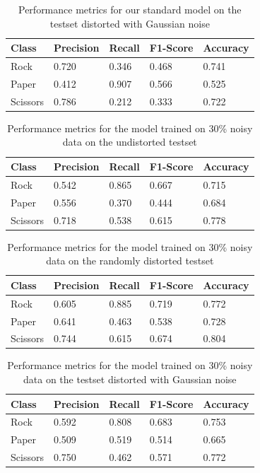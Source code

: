 \documentclass[a4paper]{article}
\begin{document}
\begin{table}[H]
	\centering
	\caption{Performance metrics for our standard model on the testset distorted with Gaussian noise}
	\label{tbl:metrics_model_gauss}
	\begin{tabular}{@{}lllll@{}}
		\toprule
		Class    & Precision & Recall & F1-Score & Accuracy \\ \midrule
		Rock     & 0.720     & 0.346  & 0.468    & 0.741    \\
		Paper    & 0.412     & 0.907  & 0.566    & 0.525    \\
		Scissors & 0.786     & 0.212  & 0.333    & 0.722    \\ \bottomrule
	\end{tabular}
\end{table}

\begin{table}[H]
	\centering
	\caption{Performance metrics for the model trained on 30\% noisy data on the undistorted testset}
	\label{tbl:noisy_model_noDis}
	\begin{tabular}{@{}lllll@{}}
		\toprule
		Class    & Precision & Recall & F1-Score & Accuracy \\ \midrule
		Rock     & 0.542     & 0.865  & 0.667    & 0.715    \\
		Paper    & 0.556     & 0.370  & 0.444    & 0.684    \\
		Scissors & 0.718     & 0.538  & 0.615    & 0.778    \\ \bottomrule
	\end{tabular}
\end{table}

\begin{table}[H]
	\centering
	\caption{Performance metrics for the model trained on 30\% noisy data on the randomly distorted testset}
	\label{tbl:noisy_model_rm}
	\begin{tabular}{@{}lllll@{}}
		\toprule
		Class    & Precision & Recall & F1-Score & Accuracy \\ \midrule
		Rock     & 0.605     & 0.885  & 0.719    & 0.772    \\
		Paper    & 0.641     & 0.463  & 0.538    & 0.728    \\
		Scissors & 0.744     & 0.615  & 0.674    & 0.804    \\ \bottomrule
	\end{tabular}
\end{table}

\begin{table}[H]
	\centering
	\caption{Performance metrics for the model trained on 30\% noisy data on the testset distorted with Gaussian noise}
	\label{tbl:noisy_model_Gauss}
	\begin{tabular}{@{}lllll@{}}
		\toprule
		Class    & Precision & Recall & F1-Score & Accuracy \\ \midrule
		Rock     & 0.592     & 0.808  & 0.683    & 0.753    \\
		Paper    & 0.509     & 0.519  & 0.514    & 0.665    \\
		Scissors & 0.750     & 0.462  & 0.571    & 0.772    \\ \bottomrule
	\end{tabular}
\end{table}
\end{document}
